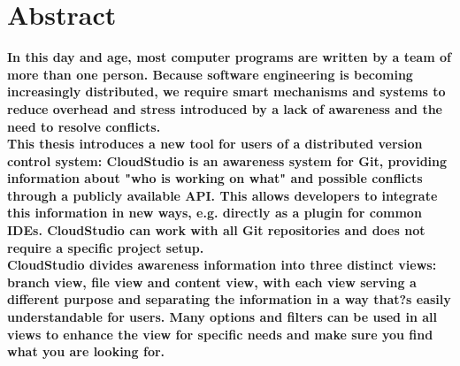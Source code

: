 


\chapter*{Abstract}

\textbf{In this day and age, most computer programs are written by a team of more than one person. Because software engineering is becoming increasingly distributed, we require smart mechanisms and systems to reduce overhead and stress introduced by a lack of awareness and the need to resolve conflicts.} \\

\textbf{This thesis introduces a new tool for users of a distributed version control system: CloudStudio is an awareness system for Git, providing information about "who is working on what" and possible conflicts through a publicly available API. This allows developers to integrate this information in new ways, e.g. directly as a plugin for common IDEs. CloudStudio can work with all Git repositories and does not require a specific project setup.} \\

\textbf{CloudStudio divides awareness information into three distinct views: branch view, file view and content view, with each view serving a different purpose and separating the information in a way that?s easily understandable for users. Many options and filters can be used in all views to enhance the view for specific needs and make sure you find what you are looking for.}


